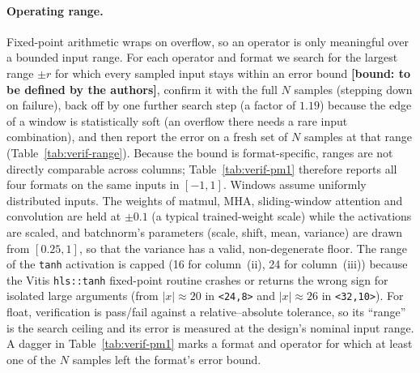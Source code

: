 \paragraph{Operating range.} Fixed-point arithmetic wraps on overflow, so an operator is only meaningful over a bounded input range. For each
operator and format we search for the largest range $\pm r$ for which every sampled input stays within an error bound
\textbf{[bound: to be defined by the authors]}, confirm it with the full $N$ samples (stepping down on failure), back off by one further search step (a factor of $1.19$) because the edge of
a window is statistically soft (an overflow there needs a rare input combination), and then report the error on a fresh set of $N$
samples at that range (Table~\ref{tab:verif-range}). Because the bound is format-specific, ranges are not directly comparable across
columns; Table~\ref{tab:verif-pm1} therefore reports all four formats on the same inputs in $[-1,1]$. Windows assume uniformly distributed
inputs. The weights of matmul, MHA, sliding-window attention and convolution are held at $\pm0.1$ (a typical trained-weight scale) while
the activations are scaled, and batchnorm's parameters (scale, shift, mean, variance) are drawn from $[0.25,1]$, so that the variance has a
valid, non-degenerate floor. The range of the \texttt{tanh} activation is capped (16 for column~(ii), 24 for column~(iii)) because the Vitis
\texttt{hls::tanh} fixed-point routine crashes or returns the wrong sign for isolated large arguments (from $|x|\approx20$ in \texttt{<24,8>}
and $|x|\approx26$ in \texttt{<32,10>}). For float, verification is pass/fail against a relative--absolute tolerance, so its ``range''
is the search ceiling and its error is measured at the design's nominal input range. A dagger in Table~\ref{tab:verif-pm1} marks a format and
operator for which at least one of the $N$ samples left the format's error bound.


